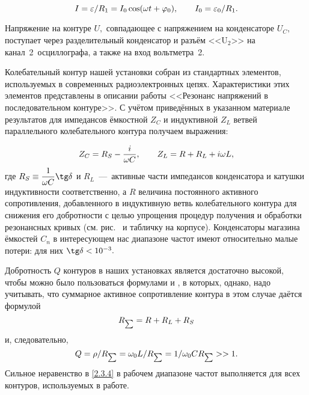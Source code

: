 \begin{equation}\eqmark{2.3.1}
	I=\varepsilon/R_1=I_0\cos(\omega t+\varphi_0), \qquad I_0=\varepsilon_0/R_1.
\end{equation}

Напряжение на контуре $U,$ совпадающее с напряжением на конденсаторе $U_C,$
поступает  через разделительный конденсатор и разъём
<<$\text{U}_2$>> на канал~2~осциллографа, а также на вход
вольтметра~2.%

Колебательный контур нашей установки собран из стандартных элементов,
используемых в современных радиоэлектронных цепях. Характеристики этих элементов
представлены в описании работы <<Резонанс напряжений в последовательном
контуре>>.  С учётом
приведённых в указанном материале результатов для импедансов ёмкостной $Z_C$ и
индуктивной $Z_L$ ветвей параллельного колебательного контура получаем
выражения:

\begin{equation}\eqmark{2.3.2}
	Z_C=R_S-\dfrac{i}{\omega C}, \qquad Z_L=R+R_L+i\omega L,
\end{equation}
где $R_S\equiv\dfrac{1}{\omega C}\tg\delta$ и $R_L$~---~активные части
импедансов конденсатора и катушки индуктивности соответственно, а $R$  величина
постоянного активного сопротивления, добавленного в индуктивную ветвь
колебательного контура для снижения его добротности с целью упрощения  процедур
получения и обработки резонансных кривых (см. рис.~ и табличку
на корпусе). Конденсаторы магазина ёмкостей $C_n$ в интересующем нас диапазоне
частот имеют относительно малые потери: для них $\tg\delta<10^{-3}.$

Добротность $Q$ контуров в наших установках является достаточно высокой, чтобы
можно было пользоваться формулами  и , в
которых, однако, надо учитывать, что суммарное активное сопротивление контура в
этом случае даётся формулой
\begin{equation}\eqmark{2.3.3}
	R_{\scriptscriptstyle \sum}=R+R_L+R_S
\end{equation}
и, следовательно,
\begin{equation}\eqmark{2.3.4}
	Q=\rho/R_{\scriptscriptstyle \sum}=\omega_0 L/R_{\scriptscriptstyle
\sum}=1/\omega_0 CR_{\scriptscriptstyle \sum}>>1.
\end{equation}
Сильное неравенство в \eqref{2.3.4} в рабочем диапазоне частот выполняется для
всех контуров, используемых в работе.


